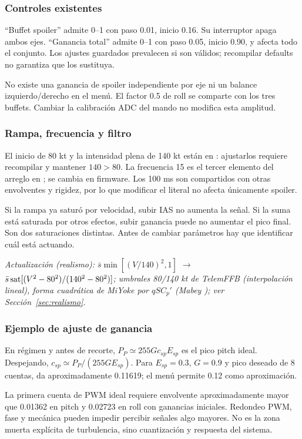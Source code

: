 \subsubsection{Controles existentes}
``Buffet spoiler'' admite 0--1 con paso 0.01, inicio 0.16. Su interruptor apaga ambos ejes. ``Ganancia total'' admite 0--1 con paso 0.05, inicio 0.90, y afecta todo el conjunto. Los ajustes guardados prevalecen si son válidos; recompilar defaults no garantiza que los sustituya.

No existe una ganancia de spoiler independiente por eje ni un balance izquierdo/derecho en el menú. El factor 0.5 de roll se comparte con los tres buffets. Cambiar la calibración ADC del mando no modifica esta amplitud.

\subsubsection{Rampa, frecuencia y filtro}
El inicio de 80 kt y la intensidad plena de 140 kt están en : ajustarlos requiere recompilar y mantener $140>80$. La frecuencia 15 es el tercer elemento del arreglo en ; se cambia en firmware. Los 100 ms son compartidos con otras envolventes y rigidez, por lo que modificar el literal no afecta únicamente spoiler.

Si la rampa ya saturó por velocidad, subir IAS no aumenta la señal. Si la suma está saturada por otros efectos, subir ganancia puede no aumentar el pico final. Son dos saturaciones distintas. Antes de cambiar parámetros hay que identificar cuál está actuando.

\textit{Actualización (realismo): $\bar s\min[(V/140)^2,1]$ $\rightarrow$ $\bar s\operatorname{sat}[(V^2-80^2)/(140^2-80^2)]$; umbrales 80/140 kt de TelemFFB (interpolación lineal), forma cuadrática de MiYoke por $qSC_p'$ (Mabey \cite{mabey1988}); ver Sección~\ref{sec:realismo}.}

\subsubsection{Ejemplo de ajuste de ganancia}
En régimen y antes de recorte, $P_P\simeq255Gc_{sp}E_{sp}$ es el pico pitch ideal. Despejando, $c_{sp}\simeq P_P/(255GE_{sp})$. Para $E_{sp}=0.3$, $G=0.9$ y pico deseado de 8 cuentas, da aproximadamente 0.11619; el menú permite 0.12 como aproximación.

La primera cuenta de PWM ideal requiere envolvente aproximadamente mayor que 0.01362 en pitch y 0.02723 en roll con ganancias iniciales. Redondeo PWM, fase y mecánica pueden impedir percibir señales algo mayores. No es la zona muerta explícita de turbulencia, sino cuantización y respuesta del sistema.

